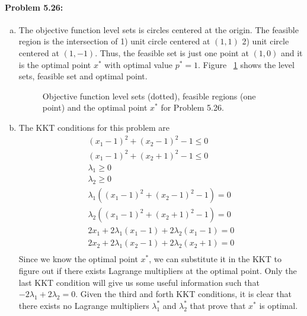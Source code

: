\documentclass[12pt] {article}
\begin{document}
\paragraph{Problem 5.26:} 
\begin{enumerate}[(a)]
\item The objective function level sets is circles centered at the origin. The feasible region is the intersection of 1) unit circle centered at $(1,1)$ 2) unit circle centered at $(1,-1)$. Thus, the feasible set is just one point at $(1,0)$ and it is the optimal point $x^{*}$ with optimal value  $p^{*}=1$. Figure ~\ref{fig:5_26_a} shows the level sets, feasible set and optimal point. 

\begin{figure}[!tbh]
\centering        
   \caption{Objective function level sets (dotted), feasible regions (one point) and the optimal point $x^{*}$ for Problem 5.26. }
   \label{fig:5_26_a}
\end{figure}

\item The KKT conditions for this problem are
\[
\begin{array}{c}
(x_{1}-1)^{2}+(x_{2}-1)^{2}-1 \leq 0\\
(x_{1}-1)^{2}+(x_{2}+1)^{2}-1 \leq 0\\
\lambda_{1} \geq 0 \\
\lambda_{2} \geq 0 \\
\lambda_{1}\left((x_{1}-1)^{2}+(x_{2}-1)^{2}-1\right)= 0\\
\lambda_{2}\left((x_{1}-1)^{2}+(x_{2}+1)^{2}-1\right)= 0\\
2x_{1} + 2\lambda_{1}(x_{1}-1)+ 2\lambda_{2}(x_{1}-1) = 0\\
2x_{2} + 2\lambda_{1}(x_{2}-1)+ 2\lambda_{2}(x_{2}+1) = 0\\
\end{array} 
\]
Since we know the optimal point $x^{*}$, we can substitute it in the KKT to figure out if there exists Lagrange multipliers at the optimal point. Only the last KKT condition will give us some useful information such that $-2\lambda_{1}+2\lambda_{2}=0$. Given the third and forth KKT conditions, it is clear that there exists no Lagrange multipliers $\lambda^{*}_{1}$ and $\lambda^{*}_{2}$ that prove that $x^{*}$ is optimal. 


\end{enumerate}
\end{document}
